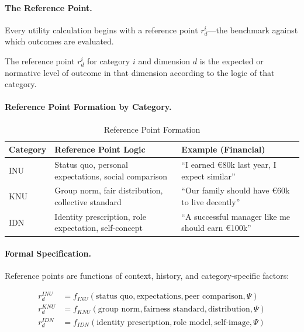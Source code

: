 \paragraph{The Reference Point.}
Every utility calculation begins with a reference point $r^i_d$---the 
benchmark against which outcomes are evaluated.

\begin{definition}
\label{def:reference-point}
The reference point $r^i_d$ for category $i$ and dimension $d$ is the 
expected or normative level of outcome in that dimension according to 
the logic of that category.
\end{definition}

\paragraph{Reference Point Formation by Category.}

\begin{table}[htbp]
\centering
\caption{Reference Point Formation}
\label{tab:reference-formation}
\renewcommand{\arraystretch}{1.4}
\begin{tabular}{@{}lp{5cm}p{5cm}@{}}
\toprule
\textbf{Category} & \textbf{Reference Point Logic} & \textbf{Example (Financial)} \\
\midrule
INU & Status quo, personal expectations, social comparison & 
``I earned \euro{80k} last year, I expect similar'' \\
\addlinespace
KNU & Group norm, fair distribution, collective standard & 
``Our family should have \euro{60k} to live decently'' \\
\addlinespace
IDN & Identity prescription, role expectation, self-concept & 
``A successful manager like me should earn \euro{100k}'' \\
\bottomrule
\end{tabular}
\end{table}

\paragraph{Formal Specification.}
Reference points are functions of context, history, and category-specific factors:

\begin{align}
r^{INU}_d &= f_{INU}(\text{status quo}, \text{expectations}, \text{peer comparison}, \Psi) \\
r^{KNU}_d &= f_{KNU}(\text{group norm}, \text{fairness standard}, \text{distribution}, \Psi) \\
r^{IDN}_d &= f_{IDN}(\text{identity prescription}, \text{role model}, \text{self-image}, \Psi)
\end{align}

